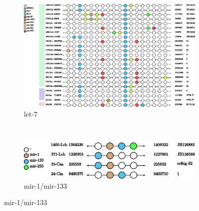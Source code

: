 \documentclass[11pt]{article}
\begin{document}
\begin{figure}[ht!]
\centering
    \begin{subfigure}[t]{1\textwidth}
        \centering
        \includegraphics[height=9 cm]{Cluster_images/let-7_101_128}
        \caption{let-7}
\label{let-7}

    \end{subfigure}
    \\
    \begin{subfigure}[t]{0.45\textwidth}
        \centering
        \includegraphics[height=1.2 cm]{Cluster_images/mir-1_119_33}
        \caption{mir-1/mir-133}
\label{mir-1/mir-133}


\end{subfigure}
\end{figure}
\end{document}
